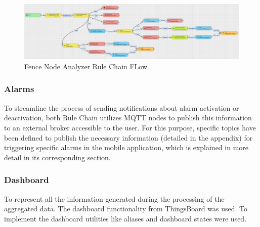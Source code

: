 \begin{figure}[H]
    \centering
    \includegraphics[width=1\textwidth]{./images/8/FenceNodeAnalyzer.PNG}
    \caption{Fence Node Analyzer Rule Chain FLow}
    \label{fig:FenceNodeAnalyzer}
\end{figure}

\subsubsection*{Alarms}

To streamline the process of sending notifications about alarm activation or deactivation, both Rule Chain utilizes MQTT nodes to publish this information to 
an external broker accessible to the user. For this purpose, specific topics have been defined to publish the necessary information (detailed in the appendix)
for triggering specific alarms in the mobile application, which is explained in more detail in its corresponding section.

\subsubsection*{Dashboard}

To represent all the information generated during the processing of the aggregated data. The dashboard 
functionality from ThingsBoard was used. To implement the dashboard utilities like aliases and dashboard 
states were used.

